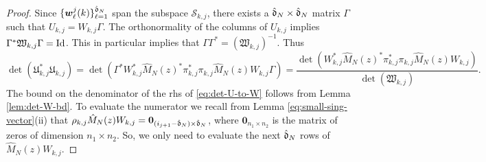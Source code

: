 \documentclass{amsart}
\numberwithin{equation}{section}
\def\corAB{}
\newcommand{\abbr}[1]{{\sc\lowercase{#1}}}
\begin{document}
\begin{proof}%
Since $\{{\bm w}_\ell^j(k)\}_{\ell=1}^{\hat{\mathfrak{d}}_N}$ span the subspace ${\mathcal S}_{k,j}$, there exists a $\hat{\mathfrak{d}}_N \times \hat{\mathfrak{d}}_N$ matrix $\Gamma$ such that $U_{k,j}=W_{k,j} \Gamma$. The orthonormality of the columns of $U_{k,j}$ implies $\Gamma^* \mathfrak{W}_{k,j} \Gamma = \corAB{\Id}$. This in particular implies that $\Gamma \Gamma^* = (\mathfrak{W}_{k,j})^{-1}$. Thus
\begin{equation}\label{eq:det-U-to-W}
\det(\mathfrak{U}^*_{k,j}  \mathfrak{U}_{k,j}) = \det(\Gamma^* W_{k,j}^* \hat{M}_N(z)^* \pi_{k,j}^* \pi_{k,j}\hat{M}_N(z) W_{k,j} \Gamma ) = \frac{\det(W_{k,j}^* \hat{M}_N(z)^* \pi_{k,j}^* \pi_{k,j} \hat{M}_N(z) W_{k,j})}{\det(\mathfrak{W}_{k,j})}.
\end{equation}
The bound on the denominator of the \abbr{RHS} of  \eqref{eq:det-U-to-W} follows from Lemma \ref{lem:det-W-bd}.
To evaluate the numerator  we recall from Lemma \ref{eq:small-sing-vector}(ii) that $\rho_{k,j} \hat{M}_N(z)W_{k,j}={\bm 0}_{(i_{j+1} -\hat{\mathfrak{d}}_N) \times \hat{\mathfrak{d}}_N}$, where ${\bm 0}_{n_1\times n_2}$ is the matrix of zeros of dimension $n_1 \times n_2$. So, we only need to evaluate the next $\hat{\mathfrak{d}}_N$ rows of $\hat{M}_N(z)W_{k,j}$.


\end{proof}
\end{document}

